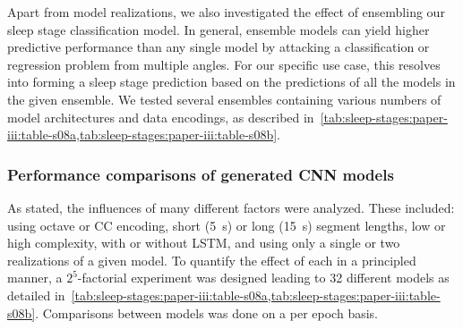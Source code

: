 Apart from model realizations, we also investigated the effect of ensembling our sleep stage classification model. 
In general, ensemble models can yield higher predictive performance than any single model by attacking a classification or regression problem from multiple angles. 
For our specific use case, this resolves into forming a sleep stage prediction based on the predictions of all the models in the given ensemble. 
We tested several ensembles containing various numbers of model architectures and data encodings, as described in~\cref{tab:sleep-stages:paper-iii:table-s08a,tab:sleep-stages:paper-iii:table-s08b}. 

\subsubsection{Performance comparisons of generated \ac{CNN} models}
As stated, the influences of many different factors were analyzed. 
These included: using octave or \ac{CC} encoding, short (\SI{5}{\second}) or long (\SI{15}{\second}) segment lengths, low or high complexity, with or without \ac{LSTM}, and using only a single or two realizations of a given model. 
To quantify the effect of each in a principled manner, a $2^5$-factorial experiment was designed leading to 32 different models as detailed in~\cref{tab:sleep-stages:paper-iii:table-s08a,tab:sleep-stages:paper-iii:table-s08b}.
Comparisons between models was done on a per epoch basis. 

